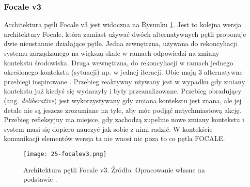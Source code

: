 \subsubsection{Focale v3}
Architektura pętli Focale v3 \cite{strassner2009} jest widoczna na Rysunku \ref{fig:25-focalev3}. Jest to kolejna wersja architektury Focale, która zamiast używać dwóch alternatywnych pętli proponuje dwie nieustannie działające pętle. Jedna zewnętrzna, używana do rekoncyliacji systemu zarządzanego na większą skale w ramach odpowiedzi na zmiany kontekstu środowiska. Druga wewnętrzna, do rekoncyliacji w ramach jednego określonego kontekstu (sytuacji) np. w jednej iteracji. Obie mają 3 alternatywne przebiegi inspirowane \cite{minsky1986}. Przebieg reaktywny używany jest w wypadku gdy zmiany kontekstu już kiedyś się wydarzyły i były przeanalizowane. Przebieg obradujący (ang. \textit{deliberative}) jest wykorzystywany gdy zmiana kontekstu jest znana, ale jej detale nie są jeszcze zrozumiane na tyle, aby móc podjąć natychmiastową akcję. Przebieg refleksyjny ma miejsce, gdy zachodzą zupełnie nowe zmiany kontekstu i system musi się dopiero nauczyć jak sobie z nimi radzić. W kontekście komunikacji elementów wersja ta nie wnosi nic poza to co pętla FOCALE.

\begin{figure}[!h]
    \centering \texttt{[image: 25-focalev3.png]}
    \caption{Architektura pętli Focale v3. Źródło: Opracowanie własne na podstawie \cite{etsieni2024}.}\label{fig:25-focalev3}
\end{figure}
